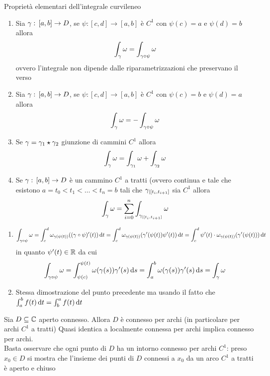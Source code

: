 \begin{prop}Propriet\`a elementari dell'integrale curvileneo
\begin{enumerate}
\item Sia $\gamma:\, [a, b]\to D$, se $\psi:[c,d]\to [a,b]$ \`e $C^1$ con $\psi(c)=a $ e $\psi(d)=b$ allora
$$\int_\gamma \omega = \int_{\gamma \circ \psi} \omega $$
ovvero l'integrale non dipende dalle riparametrizzazioni che preservano il verso 
\item Sia $\gamma:\, [a, b]\to D$, se $\psi:[c,d]\to [a,b]$ \`e $C^1$ con $\psi(c)=b $ e $\psi(d)=a$ allora
$$\int_\gamma \omega = -\int_{\gamma \circ \psi} \omega $$
\item Se $\gamma = \gamma_1\star \gamma_2$ giunzione di cammini $C^1$ allora
$$\int_\gamma\omega = \int_{\gamma_1}\omega + \int_{\gamma_2}\omega$$
\item Se $\gamma:\, [a,b]\to D$ \`e un cammino $C^1$ a tratti (ovvero continua e tale che esistono $a=t_0<t_1<\dots<t_n=b$ tali che $\gamma_{\vert [t_i,t_{i+1}]}$ sia $C^1$ allora
$$\int_\gamma \omega =\sum_{i=0}^n \int_{\gamma_{\vert [t_i,t_{i+1}]}} \omega $$
\end{enumerate}
\proof\bbianco
\begin{enumerate}
\item $$\int_{\gamma \circ \psi} \omega = \int_c^d \omega_{\gamma(\psi(t))} ((\gamma\circ \psi)'(t))\, \mathrm{d} t = 
\int_c^d \omega_{\gamma(\psi(t))} (\gamma'(\psi(t))\psi'(t))\, \mathrm{d} t=\int_c^d \psi'(t) \cdot \omega_{\gamma(\psi(t))} (\gamma'(\psi(t)))\, \mathrm{d} t$$
in quanto $\psi'(t)\in \mathbb{R}$ da cui 
$$\int_{\gamma \circ \psi} \omega = \int_{\psi(c)}^{\psi(t)} \omega(\gamma(s))\gamma'(s)\, \mathrm{d} s = \int_{a}^{b} \omega(\gamma(s))\gamma'(s)\, \mathrm{d} s= \int_\gamma \omega$$
\item Stessa dimostrazione del punto precedente ma usando il fatto che $\int_a^b f(t)\, \mathrm{d}t=\int_b^a f(t)\, \mathrm{d}t$
\end{enumerate}
\end{prop}

\begin{lem}Sia $D\subseteq \mathbb{C}$ aperto connesso. Allora $D$ \`e connesso per archi (in particolare per archi $C^1$ a tratti)
\proof Quasi identica a localmente connessa per archi implica connesso per archi.\\
Basta osservare che ogni punto di $D$ ha un intorno connesso per archi $C^1$: preso $x_0\in D$ si mostra che l'insieme dei punti di $D$ connessi a $x_0$ da un arco $C^1$ a tratti \`e aperto e chiuso
\end{lem}

